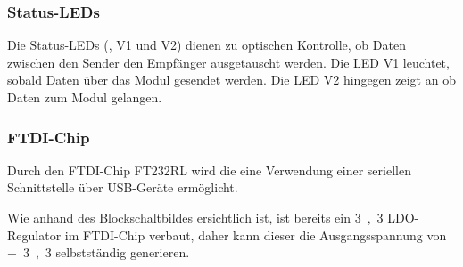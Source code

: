 \subsubsection{Status-LEDs}
Die Status-LEDs (, V1 und V2) dienen zu optischen Kontrolle, ob Daten zwischen den Sender den Empfänger ausgetauscht werden. Die LED V1 leuchtet, sobald Daten über das Modul gesendet werden. Die LED V2 hingegen zeigt an ob Daten zum Modul gelangen.


\subsubsection{FTDI-Chip}
Durch den FTDI-Chip FT232RL wird die eine Verwendung einer seriellen Schnittstelle über USB-Geräte ermöglicht.


Wie anhand des Blockschaltbildes ersichtlich ist, ist bereits ein \unit{3,3}{\volt} LDO-Regulator im FTDI-Chip verbaut, daher kann dieser die Ausgangsspannung von \unit{+3,3}{\volt} selbstständig generieren.



